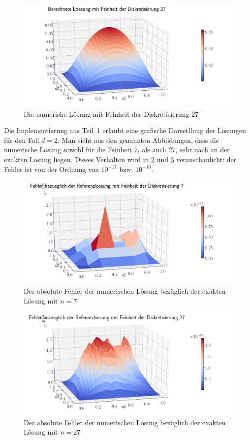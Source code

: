 \documentclass[smallheadings]{scrartcl}
\numberwithin{equation}{section}
\begin{document}
\begin{figure}[H]
	\centering
	\includegraphics[width=\linewidth]{Bericht/Bilder2/3dlos27}
	\caption{Die numerishe Lösung mit Feinheit der Diskretisierung 27}
	\label{fig:3dlos27}
\end{figure}

Die Implementierung aus Teil~1 erlaubt eine grafische Darsetllung der Lösungen für den Fall $d=2$. Man sieht aus den genannten Abbildungen, dass die numerische Lösung sowohl für die Feinheit 7, als auch 27, sehr nach an der exakten Lösung liegen. Dieses Verhalten wird in \ref{fig:3dfel7} und \ref{fig:3dfel27} veranschaulicht: der Fehler ist von der Ordnung von $10^{-17}$ bzw. $10^{-16}$.

\begin{figure}[H]
	\centering
	\includegraphics[width=\linewidth]{Bericht/Bilder2/3dfeh7}
	\caption{Der absolute Fehler der numerischen Lösung bezüglich der exakten Lösung mit $n=7$}
	\label{fig:3dfel7}
\end{figure}

\begin{figure}[H]
	\centering
	\includegraphics[width=\linewidth]{Bericht/Bilder2/3dfeh27}
	\caption{Der absolute Fehler der numerischen Lösung bezüglich der exakten Lösung mit $n=27$}
	\label{fig:3dfel27}
\end{figure}
\end{document}
